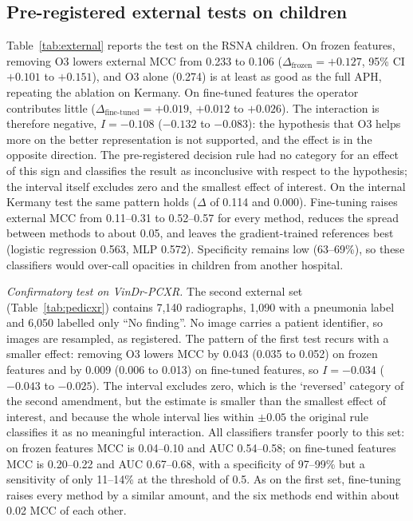 \documentclass[preprint,12pt]{elsarticle}
\begin{document}
\subsection{Pre-registered external tests on children}\label{sec:external}
Table~\ref{tab:external} reports the test on the RSNA children. On frozen features, removing O3 lowers external MCC from 0.233 to 0.106 ($\Delta_{\mathrm{frozen}}=+0.127$, 95\% CI $+0.101$ to $+0.151$), and O3 alone (0.274) is at least as good as the full APH, repeating the ablation on Kermany. On fine-tuned features the operator contributes little ($\Delta_{\mathrm{fine\text{-}tuned}}=+0.019$, $+0.012$ to $+0.026$). The interaction is therefore negative, $I=-0.108$ ($-0.132$ to $-0.083$): the hypothesis that O3 helps more on the better representation is not supported, and the effect is in the opposite direction. The pre-registered decision rule had no category for an effect of this sign and classifies the result as inconclusive with respect to the hypothesis; the interval itself excludes zero and the smallest effect of interest. On the internal Kermany test the same pattern holds ($\Delta$ of 0.114 and 0.000). Fine-tuning raises external MCC from 0.11--0.31 to 0.52--0.57 for every method, reduces the spread between methods to about 0.05, and leaves the gradient-trained references best (logistic regression 0.563, MLP 0.572). Specificity remains low (63--69\%), so these classifiers would over-call opacities in children from another hospital.



\emph{Confirmatory test on VinDr-PCXR.} The second external set (Table~\ref{tab:pedicxr}) contains 7,140 radiographs, 1,090 with a pneumonia label and 6,050 labelled only ``No finding''. No image carries a patient identifier, so images are resampled, as registered. The pattern of the first test recurs with a smaller effect: removing O3 lowers MCC by 0.043 (0.035 to 0.052) on frozen features and by 0.009 (0.006 to 0.013) on fine-tuned features, so $I=-0.034$ ($-0.043$ to $-0.025$). The interval excludes zero, which is the `reversed' category of the second amendment, but the estimate is smaller than the smallest effect of interest, and because the whole interval lies within $\pm0.05$ the original rule classifies it as no meaningful interaction. All classifiers transfer poorly to this set: on frozen features MCC is 0.04--0.10 and AUC 0.54--0.58; on fine-tuned features MCC is 0.20--0.22 and AUC 0.67--0.68, with a specificity of 97--99\% but a sensitivity of only 11--14\% at the threshold of 0.5. As on the first set, fine-tuning raises every method by a similar amount, and the six methods end within about 0.02 MCC of each other.
\end{document}
